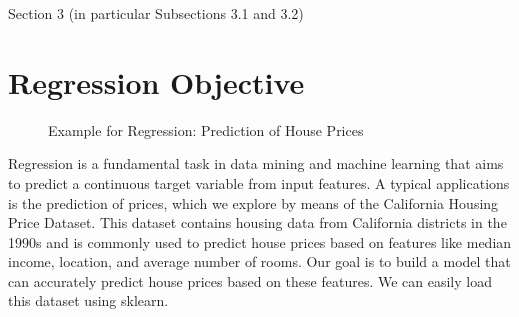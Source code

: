 \documentclass[letterpaper,10pt,english]{jupyterBook}
\let\sphinxpxdimen\pdfpxdimen\else\newdimen\sphinxpxdimen
\begin{document}
\sphinxAtStartPar
Section 3  (in particular Subsections 3.1 and 3.2)

\sphinxstepscope


\section{Regression Objective}
\label{\detokenize{regression_objective:regression-objective}}\label{\detokenize{regression_objective::doc}}
\begin{figure}[htbp]
\centering
\capstart

\noindent\sphinxincludegraphics[height=300\sphinxpxdimen]{{houses}.jpg}
\caption{Example for Regression: Prediction of House Prices}\label{\detokenize{regression_objective:houses}}\end{figure}

\sphinxAtStartPar
Regression is a fundamental task in data mining and machine learning that aims to predict a continuous target variable from input features. A typical applications is the prediction of prices, which we explore by means of the  California Housing Price Dataset. This dataset contains housing data from California districts in the 1990s and is commonly used to predict house prices based on features like median income, location, and average number of rooms. Our goal is to build a model that can accurately predict house prices based on these features. We can easily load this dataset using sklearn.
\end{document}
